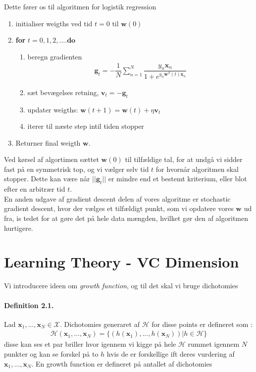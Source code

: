 \documentclass[paper=a4, fontsize=11pt]{scrartcl} %
\numberwithin{equation}{section} %
\numberwithin{figure}{section} %
\numberwithin{table}{section} %
\begin{document}
	Dette fører os til algoritmen for logistik regression
	\begin{mdframed}
	\begin{enumerate}
		\item initialiser weigths ved tid $t=0$ til $\mathbf{w}(0)$
		\item \textbf{for} $t=0,1,2,.... \mathbf{do}$
		\begin{enumerate}
			\item beregn gradienten
			\begin{align*}
			\mathbf{g}_t =-\dfrac{1}{N}\sum_{n=1}^{N}\dfrac{y_n\mathbf{x}_n}{1+e^{y_n\mathbf{w}^T(t)\mathbf{x}_n}}
			\end{align*}
			\item sæt bevægelses retning, $\mathbf{v}_t=-\mathbf{g}_t$
			\item updater weigths: $\mathbf{w}(t+1)=\mathbf{w}(t)+\eta\mathbf{v}_t$
			\item iterer til næste step intil tiden stopper
		\end{enumerate}
		\item Returner final weigth $\mathbf{w}$.
	\end{enumerate}
	\end{mdframed}
	Ved kørsel af algortimen sættet $\mathbf{w}(0)$ til tilfældige tal, for at undgå vi sidder fast på en symmetrisk top, og vi vælger selv tid $t$ for hvornår algoritmen skal stopper. Dette kan være når $||\mathbf{g}_t||$ er mindre end et bestemt kriterium, eller blot efter en arbitrær tid $t$. \\
	
	En anden udgave af gradient descent delen af vores algoritme er stochastic gradient descent, hvor der vælges et tilfældigt punkt, som vi opdatere vores $\mathbf{w}$ ud fra, is tedet for at gøre det på hele data mængden, hvilket gør den af algoritmen hurtigere. 
	
	\newpage
	
	\section*{Learning Theory - VC Dimension}
			
	Vi introducere ideen om \textit{growth function}, og til det skal vi bruge dichotomies
	\paragraph{\textbf{Definition 2.1}.} Lad $\mathbf{x}_1,...,\mathbf{x}_N\in\mathcal{X}$. Dichotomies generaret af $\mathcal{H}$ for disse points er defineret som :
	\begin{align*}
	\mathcal{H}(\mathbf{x}_1,...,\mathbf{x}_N) =\{(h(\mathbf{x}_1),...,h(\mathbf{x}_N))|h\in\mathcal{H}\}	
	\end{align*}
	disse kan ses et par briller hvor igennem vi kigge på hele $\mathcal{H}$ rummet igennem $N$ punkter og kan se forskel på to $h$ hvis de er forskellige ift deres vurdering af $\mathbf{x}_1,...,\mathbf{x}_N$. En growth function er defineret på antallet af dichotomies
\end{document}
